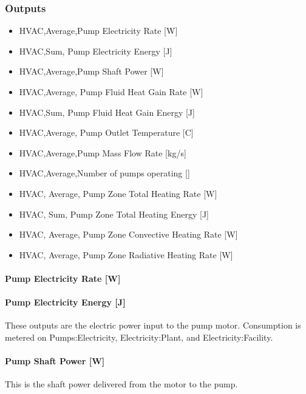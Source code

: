 \subsubsection{Outputs}\label{outputs-4-011}

\begin{itemize}
\item
  HVAC,Average,Pump Electricity Rate {[}W{]}
\item
  HVAC,Sum, Pump Electricity Energy {[}J{]}
\item
  HVAC,Average,Pump Shaft Power {[}W{]}
\item
  HVAC,Average, Pump Fluid Heat Gain Rate {[}W{]}
\item
  HVAC,Sum, Pump Fluid Heat Gain Energy {[}J{]}
\item
  HVAC,Average, Pump Outlet Temperature {[}C{]}
\item
  HVAC,Average,Pump Mass Flow Rate {[}kg/s{]}
\item
  HVAC,Average,Number of pumps operating {[]}
\item
  HVAC, Average, Pump Zone Total Heating Rate {[}W{]}
\item
  HVAC, Sum, Pump Zone Total Heating Energy {[}J{]}
\item
  HVAC, Average, Pump Zone Convective Heating Rate {[}W{]}
\item
  HVAC, Average, Pump Zone Radiative Heating Rate {[}W{]}
\end{itemize}

\paragraph{Pump Electricity Rate {[}W{]}}\label{pump-electric-power-w-4}

\paragraph{Pump Electricity Energy {[}J{]}}\label{pump-electric-energy-j-4}

These outputs are the electric power input to the pump motor. Consumption is metered on Pumps:Electricity, Electricity:Plant, and Electricity:Facility.

\paragraph{Pump Shaft Power {[}W{]}}\label{pump-shaft-power-w-4}

This is the shaft power delivered from the motor to the pump.

